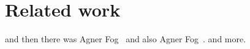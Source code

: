 \section{Related work}
\label{Related_work}
and then there was Agner Fog~\cite{fog2011optimizing} and also Agner Fog~\cite{fog2011instructiontables}. and more.